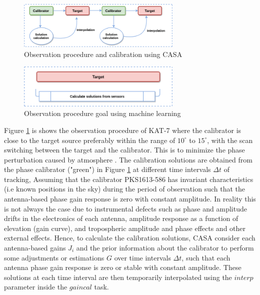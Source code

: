 \begin{figure}[H]
  \centering
    \includegraphics[width=0.7\textwidth]{images/cal4.png}
    \caption{Observation procedure and calibration using CASA}
  \label{Cal2}
\end{figure}

\begin{figure}[H]
  \centering
    \includegraphics[width=0.7\textwidth]{images/Cal3.png}
    \caption{Observation procedure goal using machine learning}
  \label{Cal3}
\end{figure}

Figure \ref{Cal2} is shows the observation procedure of KAT-7 where the calibrator is close to the target source preferably within the range of $10^{\circ}$ to $15^{\circ}$, with the scan switching  between  the target and the calibrator. This is to minimize the phase perturbation caused by atmosphere \citep{kassaye2015study}. The calibration solutions are obtained from the phase calibrator ("green") in Figure \ref{Cal2} at different time intervals $\Delta t$ of tracking, Assuming that the calibrator PKS1613-586 has invariant characteristics (i.e known positions in the sky) during the period of observation such that the 
antenna-based  phase  gain response is zero with constant amplitude. In reality this is not always the case due to instrumental defects such as phase and amplitude drifts in the electronics of each antenna, amplitude response as a function of elevation (gain curve), and tropospheric amplitude and phase effects and other external effects. Hence, to calculate the calibration solutions, CASA consider each antenna-based gains $J_i$ and the prior information about the calibrator to perform some adjustments or estimations $G$ over time intervals $\Delta t$, such that each antenna phase gain response is zero or stable with constant amplitude. These solutions at each time interval are then temporarily interpolated using the $\textit{interp}$ parameter inside the $\textit{gaincal}$ task. 

